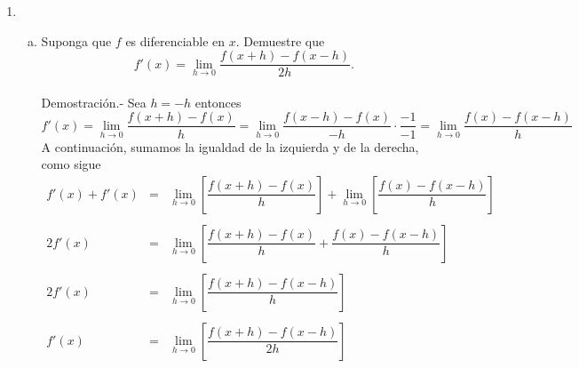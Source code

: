 \begin{enumerate}[\bfseries 1]
\begin{enumerate}[(a)]
	\end{enumerate}

    \item 
	\begin{enumerate}[(a)]

	    \item Suponga que $f$ es diferenciable en $x$. Demuestre que
	    $$f'(x)=\lim_{h\to 0}\dfrac{f(x+h)-f(x-h)}{2h}.$$\\
		Demostración.-\; Sea $h=-h$ entonces\\
		$$f'(x)=\lim_{h\to 0}\dfrac{f(x+h)-f(x)}{h}=\lim_{h\to 0}\dfrac{f(x-h)-f(x)}{-h} \cdot \dfrac{-1}{-1} = \lim_{h\to 0}\dfrac{f(x)-f(x-h)}{h}$$
		A continuación, sumamos la igualdad de la izquierda y de la derecha, como sigue\\
		$$\begin{array}{rcl}
		    f'(x)+f'(x)&=&\lim\limits_{h\to 0} \left[\dfrac{f(x+h)-f(x)}{h}\right] + \lim\limits_{h\to 0} \left[\dfrac{f(x)-f(x-h)}{h}\right]\\\\
		    2f'(x)&=& \lim\limits_{h\to 0} \left[\dfrac{f(x+h)-f(x)}{h}+\dfrac{f(x)-f(x-h)}{h}\right]\\\\
		    2f'(x)&=& \lim\limits_{h\to 0} \left[\dfrac{f(x+h)-f(x-h)}{h}\right]\\\\
		    f'(x)&=&\lim\limits_{h\to 0} \left[\dfrac{f(x+h)-f(x-h)}{2h}\right]\\\\
		\end{array}$$\\


\end{enumerate}
\end{enumerate}
